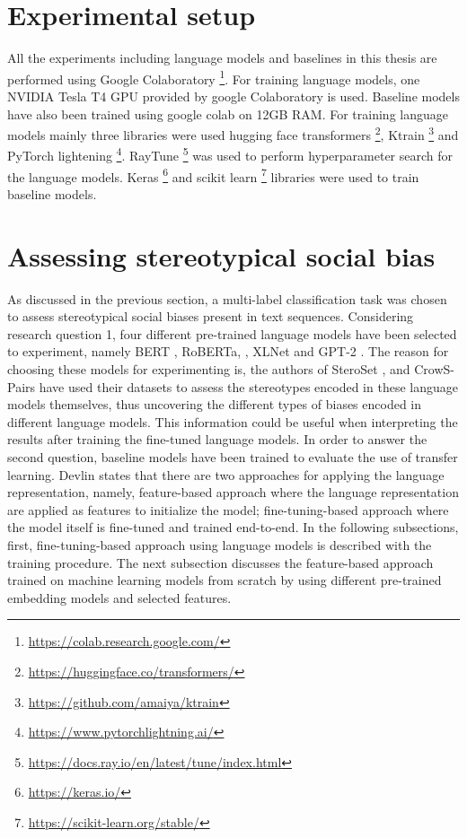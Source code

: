 \section{Experimental setup}
\label{experimental_setup}
All the experiments including language models and baselines in this thesis are performed using Google Colaboratory \footnote{\url{https://colab.research.google.com/}}. For training language models, one NVIDIA Tesla T4 GPU provided by google Colaboratory is used. Baseline models have also been trained using google colab on 12GB RAM. For training language models mainly three libraries were used hugging face transformers \footnote{\url{https://huggingface.co/transformers/}}, Ktrain \footnote{\url{https://github.com/amaiya/ktrain}} and PyTorch lightening \footnote{\url{https://www.pytorchlightning.ai/}}. RayTune \footnote{\url{https://docs.ray.io/en/latest/tune/index.html}} was used to perform hyperparameter search for the language models. Keras \footnote{\url{https://keras.io/}} and scikit learn \footnote{\url{https://scikit-learn.org/stable/}} libraries were used to train baseline models.

\section{Assessing stereotypical social bias} \label{assessing_social_biases}
As discussed in the previous section, a multi-label classification task was chosen to assess stereotypical social biases present in text sequences. Considering research question 1, four different pre-trained language models have been selected to experiment, namely BERT \cite{devlin2018bert}, RoBERTa, \cite{liu2019roberta}, XLNet \cite{yang2019xlnet} and GPT-2  \cite{radford2019language}. The reason for choosing these models for experimenting is, the authors of SteroSet 
\cite{nadeem2020stereoset}, and CrowS-Pairs\cite{nangia2020crows} have used their datasets to assess the stereotypes encoded in these language models themselves, thus uncovering the different types of biases encoded in different language models. This information could be useful when interpreting the results after training the fine-tuned language models. In order to answer the second question, baseline models have been trained to evaluate the use of transfer learning. Devlin\cite{devlin2018bert} states that there are two approaches for applying the language representation, namely, feature-based approach where the language representation are applied as features to initialize the model; fine-tuning-based approach where the model itself is fine-tuned and trained end-to-end. In the following subsections, first, fine-tuning-based approach using language models is described with the training procedure. The next subsection discusses the feature-based approach trained on machine learning models from scratch by using different pre-trained embedding models and selected features. 

